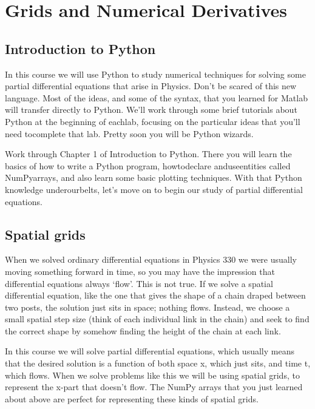 
    \chapter*{Grids and Numerical Derivatives}
    
    \section*{Introduction to Python}
  
    In this course we will use Python to study numerical techniques for solving some partial differential equations that arise in Physics. 
    Don\rq t be scared of this new language. 
    Most of the ideas, and some of the syntax, that you learned for Matlab will transfer directly to Python. 
    We\rq ll work through some brief tutorials about Python at the beginning of eachlab, focusing on the particular ideas that you\rq ll need tocomplete 		    that lab. 
    Pretty soon you will be Python wizards. 
    
    
     \begin{problem} \label{P1.1}
      Work through Chapter 1 of Introduction to Python. There you will learn the basics of how to write a Python program, howtodeclare anduseentities called NumPyarrays, and also learn some basic plotting techniques. 
      With that Python knowledge underourbelts, let\rq s move on to begin our study of partial differential equations.
    \end{problem}

    \section*{Spatial grids}
    
    When we solved ordinary differential equations in Physics 330 we were usually moving something forward in time, so you may have the impression that differential equations always \lq flow\rq .  This is not true. If we solve a spatial differential equation, like the one that gives the shape of a chain draped between two posts, the solution just sits in space; nothing flows. Instead, we choose a small spatial step size (think of each individual link in the chain) and seek to find the correct shape by somehow finding the height of the chain at each link.   
    
    In this course we will solve partial differential equations, which usually means that the desired solution is a function of both space x, which just sits, and time t, which flows. When we solve problems like this we will be using spatial grids, to represent the x-part that doesn\rq t flow. The NumPy arrays that you just learned about above are perfect for representing these kinds of spatial grids. 
    
